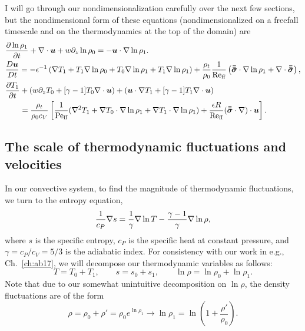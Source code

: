 I will go through our nondimensionalization carefully over the next few sections, but the nondimensional form of these equations (nondimensionalized on a freefall timescale and on the thermodynamics at the top of the domain) are
\begin{align}
&\begin{aligned}
\frac{\partial \ln\rho_1}{\partial t} + \nabla\cdot\bm{u} + w\partial_z \ln\rho_0 = -\bm{u}\cdot\nabla\ln\rho_1.
	\label{eqn:ab17continuity_nondim}
\end{aligned}\\
&\begin{aligned}
\frac{D \bm{u}}{D t} = -\epsilon^{-1}\left(\nabla T_1 + T_1\nabla\ln\rho_0 + T_0 \nabla\ln\rho_1 + T_1\nabla\ln\rho_1\right)
+ \frac{\rho_t}{\rho_0}\frac{1}{\text{Re}_{\text{ff}}} \left(\bm{\bar{\bar{\sigma}}}\cdot\nabla\ln\rho_1 + \nabla\cdot\bm{\bar{\bar{\sigma}}}\right),
\label{eqn:ab17momentum_nondim}
\end{aligned}\\
&\begin{aligned}
\frac{\partial T_1}{\partial t} &+ (w \partial_z T_0 + [\gamma-1]T_0\nabla\cdot\bm{u}) + (\bm{u}\cdot\nabla T_1 + [\gamma-1] T_1\nabla\cdot\bm{u})
\\
&= \frac{\rho_t}{\rho_0 c_V}\left[
\frac{1}{\text{Pe}_{\text{ff}}}(\nabla^2 T_1 + \nabla T_0 \cdot\nabla\ln\rho_1 + \nabla T_1 \cdot\nabla\ln\rho_1)
+ \frac{\epsilon R}{\text{Re}_{\text{ff}}} (\bm{\bar{\bar{\sigma}}}\cdot\nabla)\cdot\bm{u}
\right].
	\label{eqn:ab17energy_nondim}
\end{aligned}
\end{align}



\subsection{The scale of thermodynamic fluctuations and velocities}
In our convective system, to find the magnitude of thermodynamic fluctuations, we turn to the entropy equation,
\begin{equation}
\frac{1}{c_P}\nabla s = \frac{1}{\gamma}\nabla\ln T - \frac{\gamma - 1}{\gamma}\nabla \ln \rho,
\end{equation}
where $s$ is the specific entropy, $c_P$ is the specific heat at constant pressure, and $\gamma = c_P/c_V = 5/3$ is the adiabatic index.
For consistency with our work in e.g., Ch.~\ref{ch:ab17}, we will decompose our thermodynamic variables as follows:
$$
T = T_0 + T_1, \qquad
s = s_0 + s_1, \qquad
\ln\rho = \ln\rho_0 + \ln\rho_1.
$$
Note that due to our somewhat unintuitive decomposition on $\ln\rho$, the density fluctuations are of the form
$$
\rho = \rho_0 + \rho' = \rho_0 e^{\ln\rho_1} \rightarrow \ln\rho_1 = \ln\left(1 + \frac{\rho'}{\rho_0}\right).
$$

